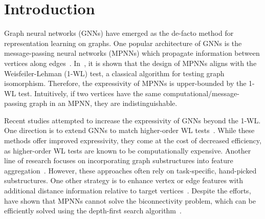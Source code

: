 \section{Introduction}
Graph neural networks (GNNs) have emerged as the de-facto method for representation learning on graphs. One popular architecture of GNNs is the message-passing neural networks (MPNNs) which propagate information between vertices along edges~\citep{gilmer2017neural, kipf2016semi,velivckovic2017graph}.  In~\citet{xu2018powerful}, it is shown that the design of MPNNs aligns with the Weisfeiler-Lehman (1-WL) test, a classical algorithm for testing graph isomorphism. Therefore, the expressivity of MPNNs is upper-bounded by the 1-WL test. Intuitively, if two vertices have the same computational/message-passing graph in an MPNN, they are indistinguishable.

Recent studies attempted to increase the expressivity of GNNs beyond the 1-WL. One direction is to extend GNNs to match higher-order WL tests~\citep{morris2019weisfeiler, morris2020weisfeiler, maron2019provably, geerts2022expressiveness}. While these methods offer improved expressivity, they come at the cost of decreased efficiency, as higher-order WL tests are known to be computationally expensive.
Another line of research focuses on incorporating graph substructures into feature aggregation~\citep{bodnar2021weisfeiler, bodnar2021weisfeilercellular}. However, these approaches often rely on task-specific, hand-picked substructures. One other strategy is to enhance vertex or edge features with additional distance information relative to target vertices~\citep{YouYL19positionaware,LiWWL20distanceencode}.
Despite the efforts, \citet{anonymous2023rethinking} have shown that MPNNs cannot solve the biconnectivity problem, which can be efficiently solved using the depth-first search algorithm~\citep{Tarjan1974-eb}. %

